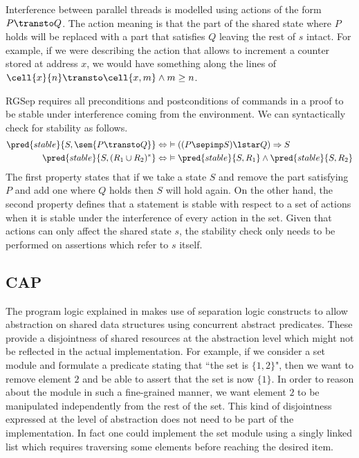 Interference between parallel threads is modelled using actions of the form $P \transto Q$. The action meaning is that the part of the shared state where $P$ holds will be replaced with a part that satisfies $Q$ leaving the rest of $s$ intact. For example, if we were describing the action that allows to increment a counter stored at address $x$, we would have something along the lines of $\cell{x}{n} \transto \cell{x, m} \land m \geq n$.

RGSep requires all preconditions and postconditions of commands in a proof to be stable under interference coming from the environment. We can syntactically check for stability as follows.
\begin{align*}
\pred{stable}{S, \sem{P \transto Q}} &\Leftrightarrow\ \vDash ((P \sepimp S) \lstar Q) \Rightarrow S
\\
\pred{stable}{S, (R_1 \cup R_2)^*} &\Leftrightarrow\ \vDash \pred{stable}{S, R_1} \land \pred{stable}{S, R_2}
\end{align*}
The first property states that if we take a state $S$ and remove the part satisfying $P$ and add one where $Q$ holds then $S$ will hold again. On the other hand, the second property defines that a statement is stable with respect to a set of actions when it is stable under the interference of every action in the set. Given that actions can only affect the shared state $s$, the stability check only needs to be performed on assertions which refer to $s$ itself.

\subsection{CAP}

The program logic explained in \cite{cap} makes use of separation logic constructs to allow abstraction on shared data structures using concurrent abstract predicates. These provide a disjointness of shared resources at the abstraction level which might not be reflected in the actual implementation. For example, if we consider a set module and formulate a predicate stating that ``the set is $\{ 1,2 \}$", then we want to remove element $2$ and be able to assert that the set is now $\{ 1 \}$. In order to reason about the module in such a fine-grained manner, we want element $2$ to be manipulated independently from the rest of the set. This kind of disjointness expressed at the level of abstraction does not need to be part of the implementation. In fact one could implement the set module using a singly linked list which requires traversing some elements before reaching the desired item.


